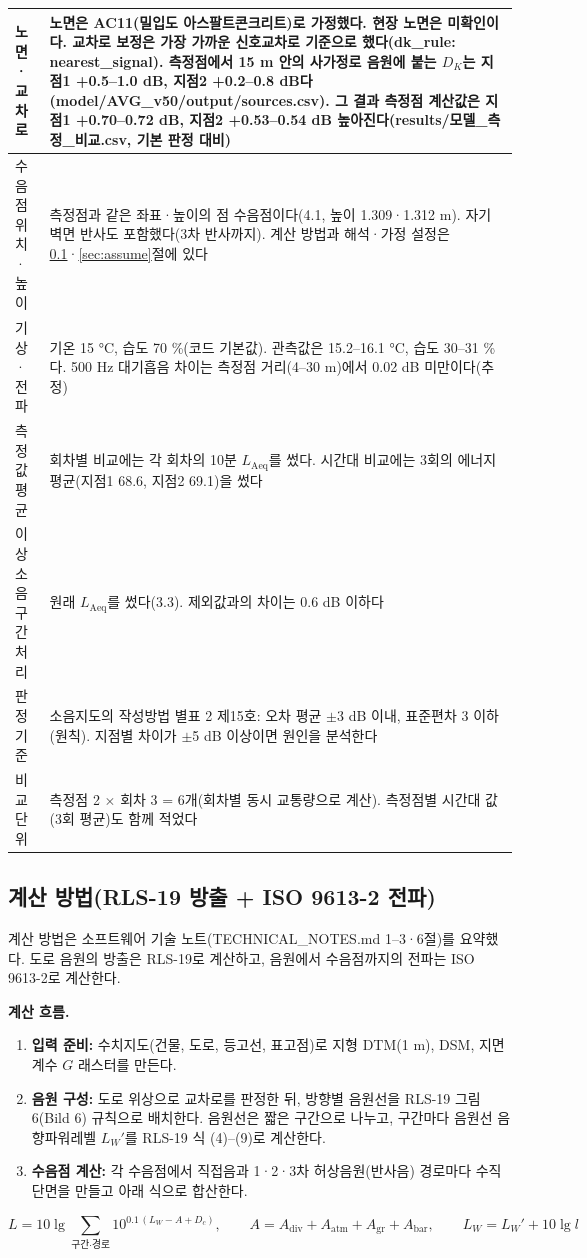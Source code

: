 \documentclass[10.5pt,a4paper]{article}
\newcommand{\Laeq}{\ensuremath{L_{\mathrm{Aeq}}}}
\begin{document}
\begin{longtable}{L{0.24}L{0.76}}
노면·교차로 & 노면은 AC11(밀입도 아스팔트콘크리트)로 가정했다. 현장 노면은 미확인이다. 교차로 보정은 가장 가까운 신호교차로 기준으로 했다(dk\_rule: nearest\_signal). 측정점에서 15 m 안의 사가정로 음원에 붙는 $D_K$는 지점1 +0.5--1.0 dB, 지점2 +0.2--0.8 dB다(model/AVG\_v50/output/sources.csv). 그 결과 측정점 계산값은 지점1 +0.70--0.72 dB, 지점2 +0.53--0.54 dB 높아진다(results/모델\_측정\_비교.csv, 기본 판정 대비) \\ \midrule
수음점 위치·높이 & 측정점과 같은 좌표·높이의 점 수음점이다(4.1, 높이 1.309·1.312 m). 자기 벽면 반사도 포함했다(3차 반사까지). 계산 방법과 해석·가정 설정은 \ref{sec:method}·\ref{sec:assume}절에 있다 \\ \midrule
기상·전파 & 기온 15 °C, 습도 70 \%(코드 기본값). 관측값은 15.2--16.1 °C, 습도 30--31 \%다. 500 Hz 대기흡음 차이는 측정점 거리(4--30 m)에서 0.02 dB 미만이다(추정) \\ \midrule
측정값 평균 & 회차별 비교에는 각 회차의 10분 \Laeq 를 썼다. 시간대 비교에는 3회의 에너지평균(지점1 68.6, 지점2 69.1)을 썼다 \\ \midrule
이상 소음 구간 처리 & 원래 \Laeq 를 썼다(3.3). 제외값과의 차이는 0.6 dB 이하다 \\ \midrule
판정 기준 & 소음지도의 작성방법 별표 2 제15호: 오차 평균 $\pm$3 dB 이내, 표준편차 3 이하(원칙). 지점별 차이가 $\pm$5 dB 이상이면 원인을 분석한다 \\ \midrule
비교 단위 & 측정점 2 $\times$ 회차 3 = 6개(회차별 동시 교통량으로 계산). 측정점별 시간대 값(3회 평균)도 함께 적었다 \\
\end{longtable}
\addtocounter{table}{-1}
\normalsize

\subsection{계산 방법(RLS-19 방출 + ISO 9613-2 전파)}\label{sec:method}
계산 방법은 소프트웨어 기술 노트(TECHNICAL\_NOTES.md 1--3·6절)를 요약했다. 도로 음원의 방출은 RLS-19로 계산하고, 음원에서 수음점까지의 전파는 ISO 9613-2로 계산한다.

\textbf{계산 흐름.}
\begin{enumerate}
\item \textbf{입력 준비:} 수치지도(건물, 도로, 등고선, 표고점)로 지형 DTM(1 m), DSM, 지면계수 $G$ 래스터를 만든다.
\item \textbf{음원 구성:} 도로 위상으로 교차로를 판정한 뒤, 방향별 음원선을 RLS-19 그림 6(Bild 6) 규칙으로 배치한다. 음원선은 짧은 구간으로 나누고, 구간마다 음원선 음향파워레벨 $L_W'$를 RLS-19 식 (4)--(9)로 계산한다.
\item \textbf{수음점 계산:} 각 수음점에서 직접음과 1·2·3차 허상음원(반사음) 경로마다 수직단면을 만들고 아래 식으로 합산한다.
\end{enumerate}
\begin{equation*}
L = 10\lg\sum_{\text{구간·경로}} 10^{0.1\,(L_W - A + D_c)}, \qquad A = A_{\mathrm{div}} + A_{\mathrm{atm}} + A_{\mathrm{gr}} + A_{\mathrm{bar}}, \qquad L_W = L_W' + 10\lg l
\end{equation*}
\end{document}
